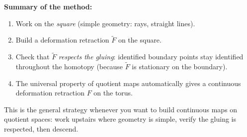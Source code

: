 \documentclass[11pt]{report}
\begin{document}
\begin{exbox}
\textbf{Summary of the method:}
\begin{enumerate}[nosep]
    \item Work on the \emph{square} (simple geometry: rays, straight lines).
    \item Build a deformation retraction $\tilde{F}$ on the square.
    \item Check that $\tilde{F}$ \emph{respects the gluing}: identified boundary points stay identified throughout the homotopy (because $\tilde{F}$ is stationary on the boundary).
    \item The universal property of quotient maps automatically gives a continuous deformation retraction $F$ on the torus.
\end{enumerate}
This is the general strategy whenever you want to build continuous maps on quotient spaces: work upstairs where geometry is simple, verify the gluing is respected, then descend.
\end{exbox}
\end{document}
